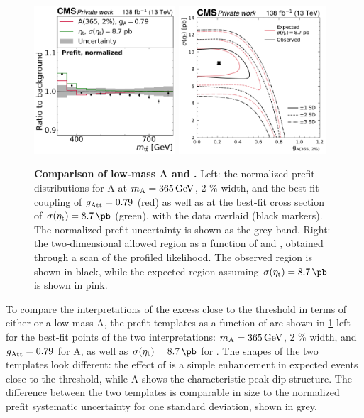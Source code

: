 \begin{figure}[!th]
    \centering
    \includegraphics[width=0.47\textwidth]{figures/ah/AvsEtaT_prefit.pdf}%
    \hspace*{0.05\textwidth}%
    \includegraphics[width=0.49\textwidth]{figures/ah/AvsEtaT_nllscan.pdf} \\
    \caption{%
        \textbf{Comparison of low-mass A and \etat.} Left: the normalized prefit \mtt distributions for A at $\mA = \SI{365}{\GeV}$, 2 \% width, and the best-fit coupling of $g_{\mathrm{A t \bar{t}}} = 0.79$ (red) as well as \etat at the best-fit cross section of $\sigetat = \SI{8.7}{\pb}$ (green), with the data overlaid (black markers). The normalized prefit uncertainty is shown as the grey band. Right: the two-dimensional allowed region as a function of \gAtt and \sigetat, obtained through a scan of the profiled likelihood. The observed region is shown in black, while the expected region assuming $\sigetat = \SI{8.7}{\pb}$ is shown in pink.
    }
    \label{fig:ah:AvsEtaT}
\end{figure}

To compare the interpretations of the excess close to the \ttbar threshold in terms of either \etat or a low-mass A, the prefit templates as a function of \mtt are shown in \cref{fig:ah:AvsEtaT} left for the best-fit points of the two interpretations: $\mA = \SI{365}{\GeV}$, 2 \% width, and $g_{\mathrm{A t \bar{t}}} = 0.79$ for A, as well as $\sigetat = \SI{8.7}{\pb}$ for \etat. The shapes of the two templates look different: the effect of \etat is a simple enhancement in expected events close to the threshold, while A shows the characteristic peak-dip structure. The difference between the two templates is comparable in size to the normalized prefit systematic uncertainty for one standard deviation, shown in grey.

